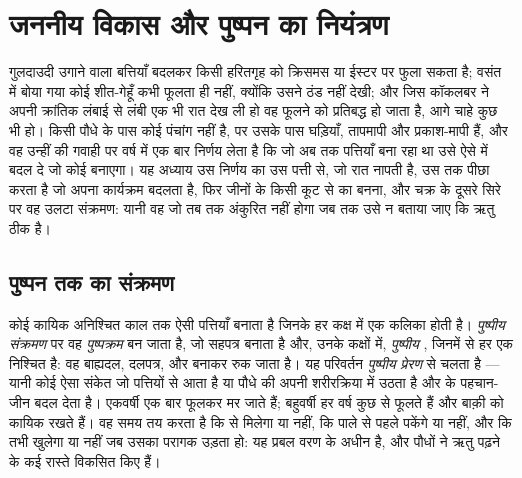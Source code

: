 \chapter{जननीय विकास और पुष्पन का नियंत्रण}\label{ch:b2:plant-flowering}

गुलदाउदी उगाने वाला बत्तियाँ बदलकर किसी हरितगृह को क्रिसमस या ईस्टर पर
फुला सकता है; वसंत में बोया गया कोई शीत-गेहूँ कभी फूलता ही नहीं, क्योंकि
उसने ठंड नहीं देखी; और जिस कॉकलबर ने अपनी क्रांतिक लंबाई से लंबी एक भी
रात देख ली हो वह फूलने को प्रतिबद्ध हो जाता है, आगे चाहे कुछ भी हो। किसी
पौधे के पास कोई पंचांग नहीं है, पर उसके पास घड़ियाँ, तापमापी और प्रकाश-मापी
हैं, और वह उन्हीं की गवाही पर वर्ष में एक बार निर्णय लेता है कि जो
 अब तक पत्तियाँ बना रहा था उसे ऐसे  में बदल दे जो कोई
 बनाएगा। यह अध्याय उस निर्णय का उस पत्ती से, जो रात नापती है, उस
 तक पीछा करता है जो अपना कार्यक्रम बदलता है, फिर जीनों के किसी
कूट से  का बनना, और चक्र के दूसरे सिरे पर वह उलटा संक्रमण: यानी वह
 जो तब तक अंकुरित नहीं होगा जब तक उसे न बताया जाए कि ऋतु ठीक है।

\section{पुष्पन तक का संक्रमण}

\begin{definition}[पुष्पीय संक्रमण और प्रेरण]\label{def:b2:plant-flowering:transition}
कोई कायिक  अनिश्चित काल तक ऐसी पत्तियाँ बनाता
है जिनके हर कक्ष में एक कलिका होती है। \emph{पुष्पीय संक्रमण} पर वह
\emph{पुष्पक्रम } बन जाता है, जो सहपत्र बनाता है और, उनके
कक्षों में, \emph{पुष्पीय }, जिनमें से हर एक निश्चित है: वह
बाह्यदल, दलपत्र,  और  बनाकर रुक जाता है। यह परिवर्तन
\emph{पुष्पीय प्रेरण} से चलता है --- यानी कोई ऐसा संकेत जो पत्तियों से
आता है या पौधे की अपनी शरीरक्रिया में उठता है और
 के पहचान-जीन बदल देता है। एकवर्षी एक बार फूलकर मर जाते हैं;
बहुवर्षी हर वर्ष कुछ  से फूलते हैं और बाक़ी को कायिक रखते
हैं। वह समय तय करता है कि   से मिलेगा या नहीं, कि
 पाले से पहले पकेंगे या नहीं, और कि  तभी खुलेगा या नहीं जब उसका
परागक उड़ता हो: यह प्रबल वरण के अधीन है, और पौधों ने ऋतु पढ़ने के कई
रास्ते विकसित किए हैं।
\end{definition}

